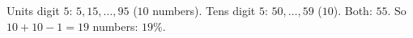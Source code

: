Units digit $5$: $5,15,\dots,95$ ($10$ numbers). Tens digit $5$: $50,\dots,59$ ($10$). Both: $55$. So $10+10-1=19$ numbers: $\boxed{19\%}$.

